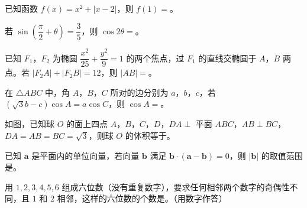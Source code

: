 \begin{question}
已知函数 $f(x)=x^2+|x-2|$，则 $f(1)=$\gkblank{}。

\end{question}
\begin{question}
若 $\sin\left(\dfrac{\pi}2+\theta\right)=\dfrac35$，则 $\cos2\theta=$\gkblank{}。

\end{question}
\begin{question}
已知 $F_1$，$F_2$ 为椭圆 $\dfrac{x^2}{25}+\dfrac{y^2}9=1$ 的两个焦点，过 $F_1$ 的直线交椭圆于 $A$，$B$ 两点。若 $|F_2A|+|F_2B|=12$，则 $|AB|=$\gkblank{}。

\end{question}
\begin{question}
在 $\triangle ABC$ 中，角 $A$，$B$，$C$ 所对的边分别为 $a$，$b$，$c$，若 $(\sqrt3b-c)\cos A=a\cos C$，则 $\cos A=$\gkblank{}。

\Needspace{0.4\textheight}
\end{question}
\begingroup
\renewenvironment{question}{\Needspace{0.46\textheight}}{}
\begin{question}
如图，已知球 $O$ 的面上四点 $A$，$B$，$C$，$D$，$DA\perp$ 平面 $ABC$，$AB\perp BC$，$DA=AB=BC=\sqrt3$，则球 $O$ 的体积等于\gkblank{}。
\nopagebreak[4]
\begin{center}\end{center}
\nopagebreak[4]
\end{question}
\endgroup
\begin{question}
已知 $\boldsymbol a$ 是平面内的单位向量，若向量 $\boldsymbol b$ 满足 $\boldsymbol b\cdot(\boldsymbol a-\boldsymbol b)=0$，则 $|\boldsymbol b|$ 的取值范围是\gkblank{}。

\end{question}
\begin{question}
用 $1,2,3,4,5,6$ 组成六位数（没有重复数字），要求任何相邻两个数字的奇偶性不同，且 $1$ 和 $2$ 相邻，这样的六位数的个数是\gkblank{}。（用数字作答）

\end{question}

